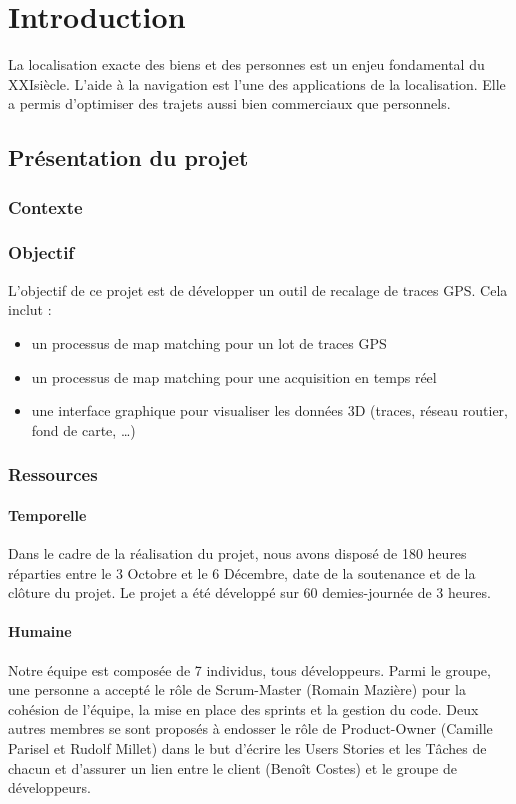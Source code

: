 \chapter{Introduction}
La localisation exacte des biens et des personnes est un enjeu fondamental du XXI\ieme siècle. L'aide à la navigation est l'une des applications de la localisation. Elle a permis d'optimiser des trajets aussi bien commerciaux que personnels.
\section{Présentation du projet}
\subsection{Contexte}

\subsection{Objectif}
L'objectif de ce projet est de développer un outil de recalage de traces GPS. Cela inclut :
\begin{itemize}
\item{} un processus de map matching pour un lot de traces GPS
\item{} un processus de map matching pour une acquisition en temps réel
\item{} une interface graphique pour visualiser les données 3D (traces, réseau routier, fond de carte, \dots)
\end{itemize}
\subsection{Ressources}
\subsubsection{Temporelle}
Dans le cadre de la réalisation du projet, nous avons disposé de 180 heures réparties entre le 3 Octobre et le 6 Décembre, date de la soutenance et de la clôture du projet. Le projet a été développé sur 60 demies-journée de 3 heures.
\subsubsection{Humaine}
Notre équipe est composée de 7 individus, tous développeurs. Parmi le groupe, une personne a accepté le rôle de Scrum-Master (Romain Mazière) pour la cohésion de l'équipe, la mise en place des sprints et la gestion du code. Deux autres membres se sont proposés à endosser le rôle de Product-Owner (Camille Parisel et Rudolf Millet) dans le but d'écrire les Users Stories et les Tâches de chacun et d'assurer un lien entre le client (Benoît Costes) et le groupe de développeurs.
